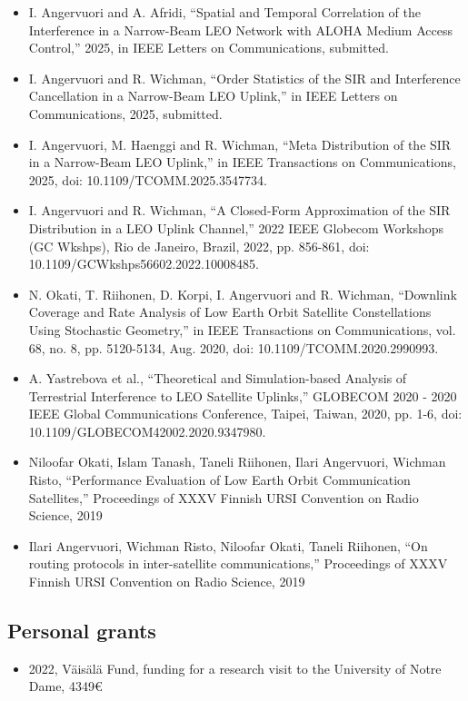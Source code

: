\documentclass{article}
\begin{document}
        \begin{itemize}
        \item
          I. Angervuori and A. Afridi, ``Spatial and Temporal Correlation of the Interference in a Narrow-Beam LEO Network with ALOHA Medium Access Control,'' 2025, in IEEE Letters on Communications, submitted.
        \item
          I. Angervuori and R. Wichman, ``Order Statistics of the SIR and Interference Cancellation in a Narrow-Beam LEO Uplink,'' in IEEE Letters on Communications, 2025, submitted.
        \item
I. Angervuori, M. Haenggi and R. Wichman, ``Meta Distribution of the SIR in a Narrow-Beam LEO Uplink,'' in IEEE Transactions on Communications, 2025, doi: 10.1109/TCOMM.2025.3547734.
        \item
          I. Angervuori and R. Wichman, ``A Closed-Form Approximation of the SIR Distribution in a LEO Uplink Channel,'' 2022 IEEE Globecom Workshops (GC Wkshps), Rio de Janeiro, Brazil, 2022, pp. 856-861, doi: 10.1109/GCWkshps56602.2022.10008485.
        \item
          N. Okati, T. Riihonen, D. Korpi, I. Angervuori and R. Wichman, ``Downlink Coverage and Rate Analysis of Low Earth Orbit Satellite Constellations Using Stochastic Geometry,'' in IEEE Transactions on Communications, vol. 68, no. 8, pp. 5120-5134, Aug. 2020, doi: 10.1109/TCOMM.2020.2990993.
        \item A. Yastrebova et al., ``Theoretical and Simulation-based Analysis of Terrestrial Interference to LEO Satellite Uplinks,'' GLOBECOM 2020 - 2020 IEEE Global Communications Conference, Taipei, Taiwan, 2020, pp. 1-6, doi: 10.1109/GLOBECOM42002.2020.9347980.
        \item Niloofar Okati, Islam Tanash, Taneli Riihonen, Ilari Angervuori, Wichman Risto, ``Performance Evaluation of Low Earth Orbit Communication Satellites,'' Proceedings of XXXV Finnish URSI Convention on Radio Science, 2019
        \item Ilari Angervuori, Wichman Risto, Niloofar Okati, Taneli Riihonen, ``On routing protocols in inter-satellite communications,'' Proceedings of XXXV Finnish URSI Convention on Radio Science, 2019
          
        \end{itemize}

        \subsection{Personal grants}
        \begin{itemize}
          \item 2022, Väisälä Fund, funding for a research visit to the University of Notre Dame, 4349€
        \end{itemize}        
\end{document}
